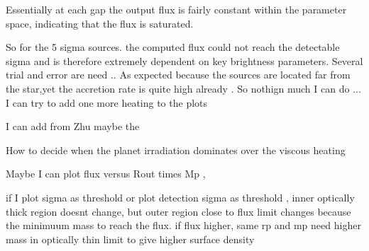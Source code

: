 \documentclass{article}
\begin{document}
Essentially at each gap the output flux is fairly constant within the parameter space, indicating that the flux is saturated. 

So for the 5 sigma sources. the computed flux could not reach the detectable sigma and is therefore extremely dependent on key brightness parameters.
Several trial and error are need .. As expected because the sources are located far from the star,yet the accretion rate is quite high already .
So nothign much I can do ... I can try to add one more heating to the plots


I can add from Zhu  maybe the 

How to decide when the planet irradiation dominates over the viscous heating

Maybe I can plot flux versus Rout times Mp , 


if I plot sigma as threshold or plot detection sigma as threshold , inner optically thick region doesnt change,
but outer region close to flux limit changes because the minimuum mass to reach the flux. if flux higher, same rp and mp need higher mass in optically thin limit to give higher surface density 
\end{document}
